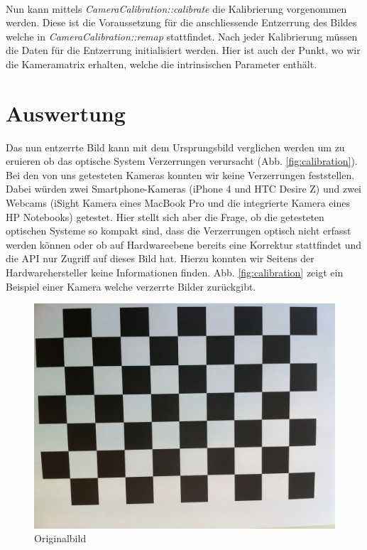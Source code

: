 \paragraph{} Nun kann mittels \textit{CameraCalibration::calibrate} die Kalibrierung vorgenommen werden. Diese ist die Voraussetzung für die anschliessende Entzerrung des Bildes welche in \textit{CameraCalibration::remap} stattfindet. Nach jeder Kalibrierung müssen die Daten für die Entzerrung initialisiert werden. Hier ist auch der Punkt, wo wir die Kameramatrix erhalten, welche die intrinsischen Parameter enthält.

\section{Auswertung} Das nun entzerrte Bild kann mit dem Ursprungsbild verglichen werden um zu eruieren ob das optische System Verzerrungen verursacht (Abb. \ref{fig:calibration}). Bei den von uns getesteten Kameras konnten wir keine Verzerrungen feststellen. Dabei würden zwei Smartphone-Kameras (iPhone 4 und HTC Desire Z) und zwei Webcams (iSight Kamera eines MacBook Pro und die integrierte Kamera eines HP Notebooks) getestet. Hier stellt sich aber die Frage, ob die getesteten optischen Systeme so kompakt sind, dass die Verzerrungen optisch nicht erfasst werden können oder ob auf Hardwareebene bereits eine Korrektur stattfindet und die API nur Zugriff auf dieses Bild hat. Hierzu konnten wir Seitens der Hardwarehersteller keine Informationen finden. Abb. \ref{fig:calibration} zeigt ein Beispiel einer Kamera welche verzerrte Bilder zurückgibt.

\begin{figure}[!ht]
\centering
\includegraphics[scale=0.1]{images/chessboard-disorted.jpg} 
\caption{Originalbild}
\label{fig:calib-d}
\end{figure}

